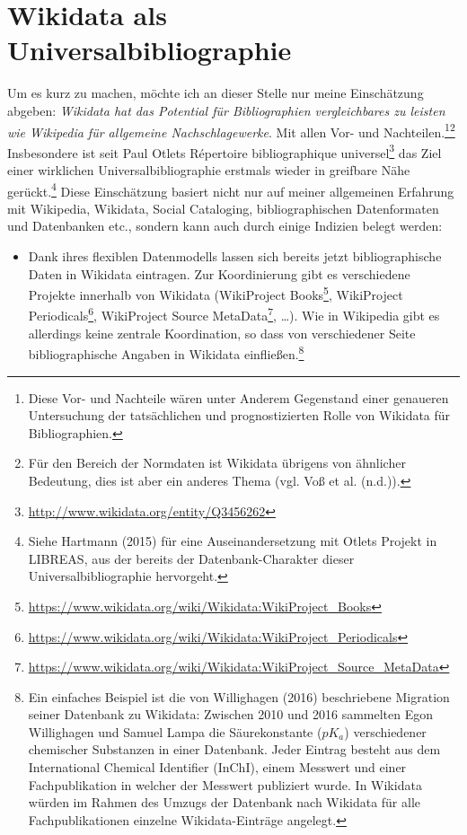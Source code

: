 \documentclass[a4paper,
fontsize=11pt,
oneside,
numbers=noperiodatend,
parskip=half-,
bibliography=totoc,
final
]{scrartcl}
\providecommand{\tightlist}{%
  \setlength{\itemsep}{0pt}\setlength{\parskip}{0pt}}
\begin{document}
\section*{Wikidata als
Universalbibliographie}\label{wikidata-als-universalbibliographie}

Um es kurz zu machen, möchte ich an dieser Stelle nur meine Einschätzung
abgeben: \emph{Wikidata hat das Potential für Bibliographien
vergleichbares zu leisten wie Wikipedia für allgemeine
Nachschlagewerke}. Mit allen Vor- und Nachteilen.\footnote{Diese Vor-
  und Nachteile wären unter Anderem Gegenstand einer genaueren
  Untersuchung der tatsächlichen und prognostizierten Rolle von Wikidata
  für Bibliographien.}\footnote{Für den Bereich der Normdaten ist
  Wikidata übrigens von ähnlicher Bedeutung, dies ist aber ein anderes
  Thema (vgl. Voß et al. (n.d.)).} Insbesondere ist seit Paul Otlets
Répertoire bibliographique universel\footnote{\url{http://www.wikidata.org/entity/Q3456262}}
das Ziel einer wirklichen Universalbibliographie erstmals wieder in
greifbare Nähe gerückt.\footnote{Siehe Hartmann (2015) für eine
  Auseinandersetzung mit Otlets Projekt in LIBREAS, aus der bereits der
  Datenbank-Charakter dieser Universalbibliographie hervorgeht.} Diese
Einschätzung basiert nicht nur auf meiner allgemeinen Erfahrung mit
Wikipedia, Wikidata, Social Cataloging, bibliographischen Datenformaten
und Datenbanken etc., sondern kann auch durch einige Indizien belegt
werden:

\begin{itemize}
\tightlist
\item
  Dank ihres flexiblen Datenmodells lassen sich bereits jetzt
  bibliographische Daten in Wikidata eintragen. Zur Koordinierung gibt
  es verschiedene Projekte innerhalb von Wikidata (WikiProject
  Books\footnote{\url{https://www.wikidata.org/wiki/Wikidata:WikiProject_Books}},
  WikiProject Periodicals\footnote{\url{https://www.wikidata.org/wiki/Wikidata:WikiProject_Periodicals}},
  WikiProject Source MetaData\footnote{\url{https://www.wikidata.org/wiki/Wikidata:WikiProject_Source_MetaData}},
  \ldots{}). Wie in Wikipedia gibt es allerdings keine zentrale
  Koordination, so dass von verschiedener Seite bibliographische Angaben
  in Wikidata einfließen.\footnote{Ein einfaches Beispiel ist die von
    Willighagen (2016) beschriebene Migration seiner Datenbank zu
    Wikidata: Zwischen 2010 und 2016 sammelten Egon Willighagen und
    Samuel Lampa die Säurekonstante (\(pK_a\)) verschiedener chemischer
    Substanzen in einer Datenbank. Jeder Eintrag besteht aus dem
    International Chemical Identifier (InChI), einem Messwert und einer
    Fachpublikation in welcher der Messwert publiziert wurde. In
    Wikidata würden im Rahmen des Umzugs der Datenbank nach Wikidata für
    alle Fachpublikationen einzelne Wikidata-Einträge angelegt.}
\end{itemize}
\end{document}
